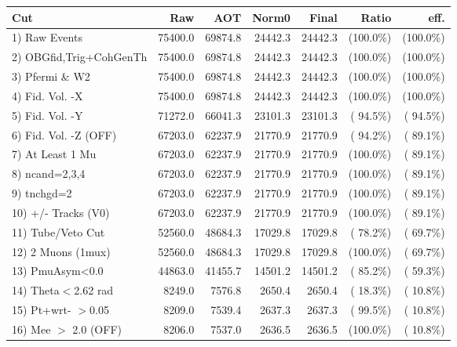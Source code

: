  \begin{table}[h!]\centering
 \begin{tabular}{||l||r|r|r|r|r|r||}
 \hline
 \hline
 Cut & Raw & AOT & Norm0 & Final & Ratio & eff.       \\
 \hline
  1) Raw Events           &      75400.0 &      69874.8 &      24442.3 &      24442.3 & (100.0\%) & (100.0\%) \\
  2) OBGfid,Trig+CohGenTh &      75400.0 &      69874.8 &      24442.3 &      24442.3 & (100.0\%) & (100.0\%) \\
  3) Pfermi \& W2         &      75400.0 &      69874.8 &      24442.3 &      24442.3 & (100.0\%) & (100.0\%) \\
  4) Fid. Vol. -X         &      75400.0 &      69874.8 &      24442.3 &      24442.3 & (100.0\%) & (100.0\%) \\
  5) Fid. Vol. -Y         &      71272.0 &      66041.3 &      23101.3 &      23101.3 & ( 94.5\%) & ( 94.5\%) \\
  6) Fid. Vol. -Z (OFF)   &      67203.0 &      62237.9 &      21770.9 &      21770.9 & ( 94.2\%) & ( 89.1\%) \\
  7) At Least 1 Mu        &      67203.0 &      62237.9 &      21770.9 &      21770.9 & (100.0\%) & ( 89.1\%) \\
  8) ncand=2,3,4          &      67203.0 &      62237.9 &      21770.9 &      21770.9 & (100.0\%) & ( 89.1\%) \\
  9) tnchgd=2             &      67203.0 &      62237.9 &      21770.9 &      21770.9 & (100.0\%) & ( 89.1\%) \\
 10) +/- Tracks (V0)      &      67203.0 &      62237.9 &      21770.9 &      21770.9 & (100.0\%) & ( 89.1\%) \\
 11) Tube/Veto Cut        &      52560.0 &      48684.3 &      17029.8 &      17029.8 & ( 78.2\%) & ( 69.7\%) \\
 12) 2 Muons (1mux)       &      52560.0 &      48684.3 &      17029.8 &      17029.8 & (100.0\%) & ( 69.7\%) \\
 13) PmuAsym<0.0          &      44863.0 &      41455.7 &      14501.2 &      14501.2 & ( 85.2\%) & ( 59.3\%) \\
 14) Theta$<$2.62 rad     &       8249.0 &       7576.8 &       2650.4 &       2650.4 & ( 18.3\%) & ( 10.8\%) \\
 15) Pt+wrt- $>$0.05      &       8209.0 &       7539.4 &       2637.3 &       2637.3 & ( 99.5\%) & ( 10.8\%) \\
 16) Mee $>$ 2.0  (OFF)   &       8206.0 &       7537.0 &       2636.5 &       2636.5 & (100.0\%) & ( 10.8\%) \\

\end{tabular}
\end{table}
